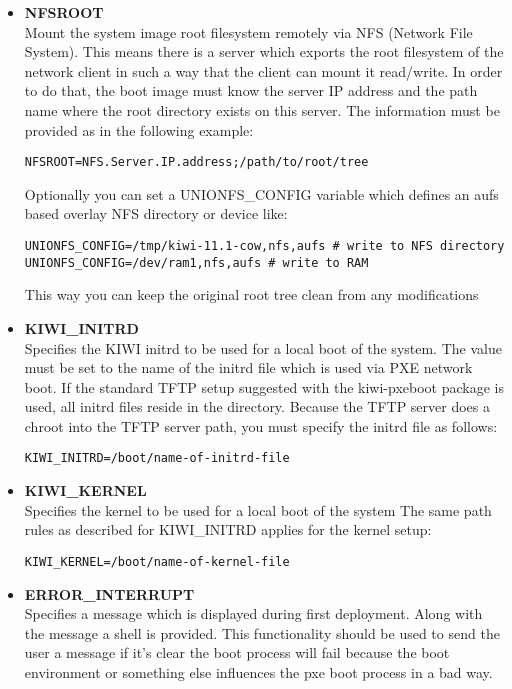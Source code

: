 \begin{itemize}
    \item \textbf{NFSROOT}\\
         Mount the system image root filesystem remotely via 
         NFS
         (Network File System). This means there is a server which
         exports the root filesystem of the network client in such a
         way that the client can mount it read/write. In order to do
         that, the boot image must know the server IP address and
         the path name where the root directory
         exists on this server. The information must be provided as
         in the following example:
\begin{verbatim}
NFSROOT=NFS.Server.IP.address;/path/to/root/tree
\end{verbatim}
         Optionally you can set a UNIONFS\_CONFIG variable which defines
         an aufs based overlay NFS directory or device like:
\begin{verbatim}
UNIONFS_CONFIG=/tmp/kiwi-11.1-cow,nfs,aufs # write to NFS directory
UNIONFS_CONFIG=/dev/ram1,nfs,aufs # write to RAM
\end{verbatim}
         This way you can keep the original root tree clean from any
         modifications
    \item \textbf{KIWI\_INITRD}\\
         Specifies the KIWI initrd to be used for a local boot of the system.
         The value must be set to the name of the initrd file which is
         used via PXE network boot. If the standard TFTP setup suggested
         with the kiwi-pxeboot package is used, all initrd files reside
         in the  directory. Because the TFTP server
         does a chroot into the TFTP server path, you must specify the
         initrd file as follows:
\begin{verbatim}
KIWI_INITRD=/boot/name-of-initrd-file
\end{verbatim}
    \item \textbf{KIWI\_KERNEL}\\
         Specifies the kernel to be used for a local boot of the system
         The same path rules as described for KIWI\_INITRD applies for
         the kernel setup:
\begin{verbatim}
KIWI_KERNEL=/boot/name-of-kernel-file
\end{verbatim}
	\item \textbf{ERROR\_INTERRUPT}\\
         Specifies a message which is displayed during first deployment.
         Along with the message a shell is provided. This functionality
         should be used to send the user a message if it's clear the
         boot process will fail because the boot environment or something
         else influences the pxe boot process in a bad way.
\end{itemize}

